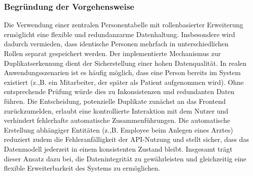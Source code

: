 \subsubsection{Begründung der Vorgehensweise}
Die Verwendung einer zentralen Personentabelle mit rollenbasierter Erweiterung ermöglicht eine flexible und redundanzarme Datenhaltung. Insbesondere wird dadurch vermieden, dass identische Personen mehrfach in unterschiedlichen Rollen separat gespeichert werden.
Der implementierte Mechanismus zur Duplikatserkennung dient der Sicherstellung einer hohen Datenqualität. In realen Anwendungsszenarien ist es häufig möglich, dass eine Person bereits im System existiert (z.,B. ein Mitarbeiter, der später als Patient aufgenommen wird). Ohne entsprechende Prüfung würde dies zu Inkonsistenzen und redundanten Daten führen.
Die Entscheidung, potenzielle Duplikate zunächst an das Frontend zurückzumelden, erlaubt eine kontrollierte Interaktion mit dem Nutzer und verhindert fehlerhafte automatische Zusammenführungen.
Die automatische Erstellung abhängiger Entitäten (z.,B. Employee beim Anlegen eines Arztes) reduziert zudem die Fehleranfälligkeit der API-Nutzung und stellt sicher, dass das Datenmodell jederzeit in einem konsistenten Zustand bleibt.
Insgesamt trägt dieser Ansatz dazu bei, die Datenintegrität zu gewährleisten und gleichzeitig eine flexible Erweiterbarkeit des Systems zu ermöglichen.
